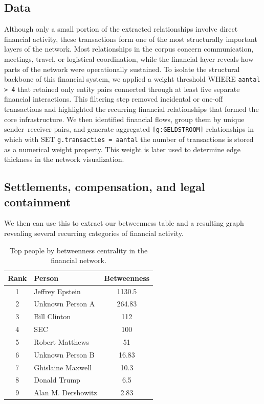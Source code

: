 \subsection{Data}
Although only a small portion of the extracted relationships involve direct financial activity, these transactions form one of the most structurally important layers of the network. Most relationships in the corpus concern communication, meetings, travel, or logistical coordination, while the financial layer reveals how parts of the network were operationally sustained.
To isolate the structural backbone of this financial system, we applied a weight threshold WHERE \texttt{aantal > 4} that retained only entity pairs connected through at least five separate financial interactions. This filtering step removed incidental or one-off transactions and highlighted the recurring financial relationships that formed the core infrastructure.
We then identified financial flows, group them by unique sender--receiver pairs, and generate aggregated \texttt{[g:GELDSTROOM]} relationships in which with SET \texttt{g.transacties = aantal} the number of transactions is stored as a numerical weight property. This weight is later used to determine edge thickness in the network visualization.
\subsection{Settlements, compensation, and legal containment}
We then can use this to extract our betweenness table and a resulting graph revealing several recurring categories of financial activity.
\begin{table}[H]
    \centering
    \begin{tabular}{c l c}
        \toprule
        Rank & Person & Betweenness \\
        \midrule
            1 & Jeffrey Epstein & 1130.5 \\
            2 & Unknown Person A & 264.83 \\
            3 & Bill Clinton & 112 \\
            4 & SEC & 100 \\
            5 & Robert Matthews & 51 \\
            6 & Unknown Person B & 16.83 \\
            7 & Ghislaine Maxwell & 10.3 \\
            8 & Donald Trump & 6.5 \\
            9 & Alan M. Dershowitz & 2.83 \\
        \bottomrule
    \end{tabular}
    \caption{Top people by betweenness centrality in the financial network.}
    \label{tab:financial_betweenness}
\end{table}

